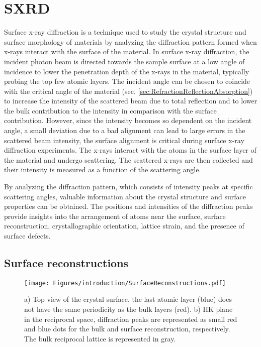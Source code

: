 \section{SXRD} \label{sec:SXRD}

Surface x-ray diffraction is a technique used to study the crystal structure and surface morphology of materials by analyzing the diffraction pattern formed when x-rays interact with the surface of the material.
In surface x-ray diffraction, the incident photon beam is directed towards the sample surface at a low angle of incidence to lower the penetration depth of the x-rays in the material, typically probing the top few atomic layers.
The incident angle can be chosen to coincide with the critical angle of the material (sec. \ref{sec:RefractionReflectionAbsorption}) to increase the intensity of the scattered beam due to total reflection and to lower the bulk contribution to the intensity in comparison with the surface contribution.
However, since the intensity becomes so dependent on the incident angle, a small deviation due to a bad alignment can lead to large errors in the scattered beam intensity, the surface alignment is critical during surface x-ray diffraction experiments.
The x-rays interact with the atoms in the surface layer of the material and undergo scattering.
The scattered x-rays are then collected and their intensity is measured as a function of the scattering angle.

By analyzing the diffraction pattern, which consists of intensity peaks at specific scattering angles, valuable information about the crystal structure and surface properties can be obtained.
The positions and intensities of the diffraction peaks provide insights into the arrangement of atoms near the surface, surface reconstruction, crystallographic orientation, lattice strain, and the presence of surface defects.

\subsection{Surface reconstructions} \label{sec:SurfaceReconstructions}

\begin{figure}[!htb]
    \centering
    \texttt{[image: Figures/introduction/SurfaceReconstructions.pdf]}
    \caption{
    a) Top view of the crystal surface, the last atomic layer (blue) does not have the same periodicity as the bulk layers (red).
    b) HK plane in the reciprocal space, diffraction peaks are represented as small red and blue dots for the bulk and surface reconstruction, respectively. The bulk reciprocal lattice is represented in gray.
    }
    \label{fig:SurfaceReconstructions}
\end{figure}

